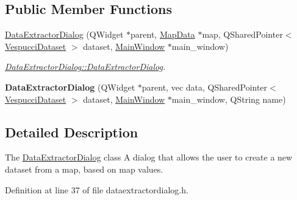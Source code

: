\subsection*{Public Member Functions}
\begin{DoxyCompactItemize}
\item 
\hyperlink{class_data_extractor_dialog_a1f258b0b0a524e2a2b574fe170ed7fdb}{Data\+Extractor\+Dialog} (Q\+Widget $\ast$parent, \hyperlink{class_map_data}{Map\+Data} $\ast$map, Q\+Shared\+Pointer$<$ \hyperlink{class_vespucci_dataset}{Vespucci\+Dataset} $>$ dataset, \hyperlink{class_main_window}{Main\+Window} $\ast$main\+\_\+window)
\begin{DoxyCompactList}\small\item\em \hyperlink{class_data_extractor_dialog_a1f258b0b0a524e2a2b574fe170ed7fdb}{Data\+Extractor\+Dialog\+::\+Data\+Extractor\+Dialog}. \end{DoxyCompactList}\item 
\hypertarget{class_data_extractor_dialog_a535646a4cce7c7e2e3b45589f0ee54aa}{{\bfseries Data\+Extractor\+Dialog} (Q\+Widget $\ast$parent, vec data, Q\+Shared\+Pointer$<$ \hyperlink{class_vespucci_dataset}{Vespucci\+Dataset} $>$ dataset, \hyperlink{class_main_window}{Main\+Window} $\ast$main\+\_\+window, Q\+String name)}\label{class_data_extractor_dialog_a535646a4cce7c7e2e3b45589f0ee54aa}

\end{DoxyCompactItemize}


\subsection{Detailed Description}
The \hyperlink{class_data_extractor_dialog}{Data\+Extractor\+Dialog} class A dialog that allows the user to create a new dataset from a map, based on map values. 

Definition at line 37 of file dataextractordialog.\+h.




